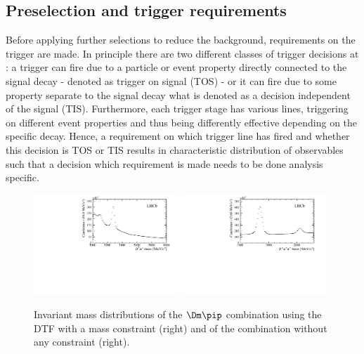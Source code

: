 \subsection{Preselection and trigger requirements}
\label{sec:preselTrigger}

Before applying further selections to reduce the background, requirements on the trigger are made.
In principle there are two different classes of trigger decisions at \lhcb: a trigger can fire due to a particle or event property directly connected to the signal decay - denoted as trigger on signal (TOS) - or it can fire due to some property separate to the signal decay what is denoted as a decision independent of the signal (TIS).
Furthermore, each trigger stage has various lines, triggering on different event properties and thus being differently effective depending on the specific decay.
Hence, a requirement on which trigger line has fired and whether this decision is TOS or TIS results in characteristic distribution of observables such that a decision which requirement is made needs to be done analysis specific.
\begin{figure}[tbp]
    \centering
    \includegraphics[width=0.485\textwidth]{06selection/figs/Bmass_afterStrippingAndTrigger.pdf}
    \includegraphics[width=0.485\textwidth]{06selection/figs/Dmass_afterStrippingAndTrigger.pdf}
    \caption{Invariant mass distributions of the $\Dm\pip$ combination using the DTF with a \Dm mass constraint (right) and of the \Kp\pim\pim combination without any constraint (right).}
    \label{fig:BAndDmassAfterStripping}
\end{figure}


